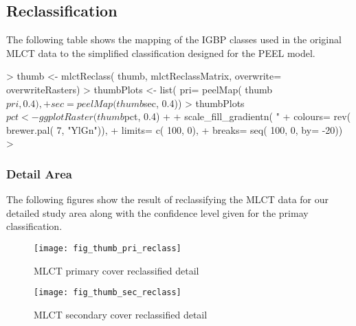 \subsection{Reclassification}
\label{sec:mlct-reclass}

The following table shows the mapping of the IGBP classes used in the
original MLCT data to the simplified classification designed for the
PEEL model.



\begin{Schunk}
\begin{Sinput}
> thumb <- mlctReclass( thumb, mlctReclassMatrix, overwrite= overwriteRasters)
> thumbPlots <- list( pri= peelMap( thumb$pri, 0.4),
+                     sec= peelMap( thumb$sec, 0.4))
> thumbPlots$pct <- ggplotRaster( thumb$pct, 0.4) + 
+   scale_fill_gradientn( "% confidence", 
+                        colours= rev( brewer.pal( 7, "YlGn")), 
+                        limits= c( 100, 0),
+                        breaks= seq( 100, 0, by= -20))
> 
\end{Sinput}
\end{Schunk}

\subsubsection{Detail Area}
\label{sec:reclass-detail-area}


The following figures show the result of reclassifying the MLCT data
for our detailed study area along with the confidence level given for
the primay classification.

\begin{figure} 
\begin{center}
  
\begin{Schunk}
\end{Schunk}

\texttt{[image: fig\_thumb\_pri\_reclass]}
\end{center} 
\caption{MLCT primary cover reclassified detail} 
\label{fig:thumb_pri_reclass} 
\end{figure} 


\begin{figure} 
\begin{center}
  
\begin{Schunk}
\end{Schunk}

\texttt{[image: fig\_thumb\_sec\_reclass]}
\end{center} 
\caption{MLCT secondary cover reclassified detail} 
\label{fig:thumb_sec_reclass} 
\end{figure} 


